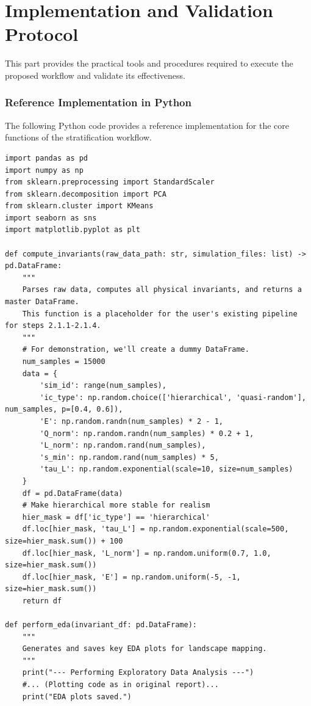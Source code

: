 \documentclass[11pt, letterpaper]{article}
\begin{document}
\part{Implementation and Validation Protocol}

This part provides the practical tools and procedures required to execute the proposed workflow and validate its effectiveness.

\section{Reference Implementation in Python}

The following Python code provides a reference implementation for the core functions of the stratification workflow.

\begin{lstlisting}
import pandas as pd
import numpy as np
from sklearn.preprocessing import StandardScaler
from sklearn.decomposition import PCA
from sklearn.cluster import KMeans
import seaborn as sns
import matplotlib.pyplot as plt

def compute_invariants(raw_data_path: str, simulation_files: list) -> pd.DataFrame:
    """
    Parses raw data, computes all physical invariants, and returns a master DataFrame.
    This function is a placeholder for the user's existing pipeline for steps 2.1.1-2.1.4.
    """
    # For demonstration, we'll create a dummy DataFrame.
    num_samples = 15000
    data = {
        'sim_id': range(num_samples),
        'ic_type': np.random.choice(['hierarchical', 'quasi-random'], num_samples, p=[0.4, 0.6]),
        'E': np.random.randn(num_samples) * 2 - 1,
        'Q_norm': np.random.randn(num_samples) * 0.2 + 1,
        'L_norm': np.random.rand(num_samples),
        's_min': np.random.rand(num_samples) * 5,
        'tau_L': np.random.exponential(scale=10, size=num_samples)
    }
    df = pd.DataFrame(data)
    # Make hierarchical more stable for realism
    hier_mask = df['ic_type'] == 'hierarchical'
    df.loc[hier_mask, 'tau_L'] = np.random.exponential(scale=500, size=hier_mask.sum()) + 100
    df.loc[hier_mask, 'L_norm'] = np.random.uniform(0.7, 1.0, size=hier_mask.sum())
    df.loc[hier_mask, 'E'] = np.random.uniform(-5, -1, size=hier_mask.sum())
    return df

def perform_eda(invariant_df: pd.DataFrame):
    """
    Generates and saves key EDA plots for landscape mapping.
    """
    print("--- Performing Exploratory Data Analysis ---")
    #... (Plotting code as in original report)...
    print("EDA plots saved.")


\end{lstlisting}
\end{document}
